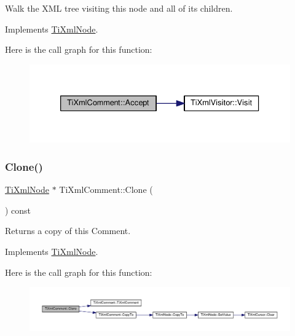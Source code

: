 Walk the X\+ML tree visiting this node and all of its children. 

Implements \hyperlink{class_ti_xml_node_acc0f88b7462c6cb73809d410a4f5bb86}{Ti\+Xml\+Node}.

Here is the call graph for this function\+:
\nopagebreak
\begin{figure}[H]
\begin{center}
\leavevmode
\includegraphics[width=333pt]{class_ti_xml_comment_ac894241530d1d266131a5026cb251a95_cgraph}
\end{center}
\end{figure}
\mbox{\label{class_ti_xml_comment_a1f9f06e2ed3f77875093436193b16c16}} 
\subsubsection{\texorpdfstring{Clone()}{Clone()}}
{\footnotesize\ttfamily \hyperlink{class_ti_xml_node}{Ti\+Xml\+Node} $\ast$ Ti\+Xml\+Comment\+::\+Clone (\begin{DoxyParamCaption}{ }\end{DoxyParamCaption}) const\hspace{0.3cm}{\ttfamily [virtual]}}



Returns a copy of this Comment. 



Implements \hyperlink{class_ti_xml_node_a4508cc3a2d7a98e96a54cc09c37a78a4}{Ti\+Xml\+Node}.

Here is the call graph for this function\+:
\nopagebreak
\begin{figure}[H]
\begin{center}
\leavevmode
\includegraphics[width=350pt]{class_ti_xml_comment_a1f9f06e2ed3f77875093436193b16c16_cgraph}
\end{center}
\end{figure}
\mbox{\label{class_ti_xml_comment_aaeb8a0b2d503f603879a2d04ceb54295}} 
